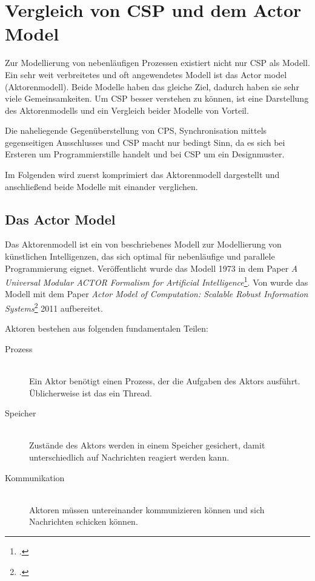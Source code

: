 \section{Vergleich von \acs{CSP} und dem Actor Model}

Zur Modellierung von nebenläufigen Prozessen existiert nicht nur \ac{CSP} als Modell. Ein sehr weit verbreitetes und oft angewendetes Modell ist das Actor model (Aktorenmodell). Beide Modelle haben das gleiche Ziel, dadurch haben sie sehr viele Gemeinsamkeiten. Um \ac{CSP} besser verstehen zu können, ist eine Darstellung des Aktorenmodells und ein Vergleich beider Modelle von Vorteil.

Die naheliegende Gegenüberstellung von \ac{CPS}, Synchronisation mittels gegenseitigen Ausschlusses und \ac{CSP} macht nur bedingt Sinn, da es sich bei Ersteren um Programmierstille handelt und bei \ac{CSP} um ein Designmuster.

Im Folgenden wird zuerst komprimiert das Aktorenmodell dargestellt und anschließend beide Modelle mit einander verglichen.

\subsection{Das Actor Model}
Das Aktorenmodell ist ein von \citeauthor{ACTORS} beschriebenes Modell zur Modellierung von künstlichen Intelligenzen, das sich optimal für nebenläufige und parallele Programmierung eignet. Veröffentlicht wurde das Modell 1973 in dem Paper \textit{A Universal Modular ACTOR Formalism for Artificial Intelligence}\footcite{ACTORS}. Von \citeauthor{ACTORSNEW} wurde das Modell mit dem Paper \textit{Actor Model of Computation: Scalable Robust Information Systems}\footcite{ACTORSNEW} 2011 aufbereitet. 

Aktoren bestehen aus folgenden fundamentalen Teilen:

\begin{description}
\item[Prozess]\hfill \\
Ein Aktor benötigt einen Prozess, der die Aufgaben des Aktors ausführt. Üblicherweise ist das ein Thread.
\item[Speicher]\hfill \\
Zustände des Aktors werden in einem Speicher gesichert, damit unterschiedlich auf Nachrichten reagiert werden kann.
\item[Kommunikation] \hfill \\
Aktoren müssen untereinander kommunizieren können und sich Nachrichten schicken können.
\end{description}

